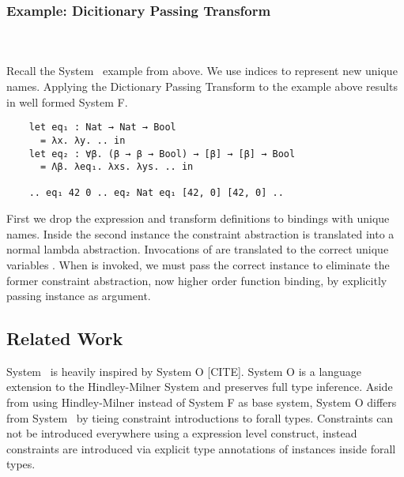 \subsubsection{Example: Dicitionary Passing Transform}\hfill\\\\
Recall the System \Fo\ example from above. We use indices to represent new unique names.
Applying the Dictionary Passing Transform to the example above results in well formed System F.
\begin{verbatim}
    let eq₁ : Nat → Nat → Bool 
      = λx. λy. .. in
    let eq₂ : ∀β. (β → β → Bool) → [β] → [β] → Bool 
      = Λβ. λeq₁. λxs. λys. .. in
    
    .. eq₁ 42 0 .. eq₂ Nat eq₁ [42, 0] [42, 0] .. 
\end{verbatim}
First we drop the \inl{|\Decl|}expression and transform \inl{|\Inst|}definitions to  bindings with unique names. 
Inside the second instance the constraint abstraction is translated into a normal lambda abstraction. 
Invocations of  are translated to the correct unique variables .
When  is invoked, we must pass the correct instance to eliminate the former constraint abstraction, now higher order function binding, by explicitly passing instance  as argument.

\subsection{Related Work}
System \Fo\ is heavily inspired by System O [CITE]. System O is a language extension to the Hindley-Milner System and preserves full type inference. 
Aside from using Hindley-Milner instead of System F as base system, System O differs from System \Fo\ by tieing constraint introductions to forall types. 
Constraints can not be introduced everywhere using a expression level construct, instead constraints are introduced via explicit type annotations of instances inside forall types. 